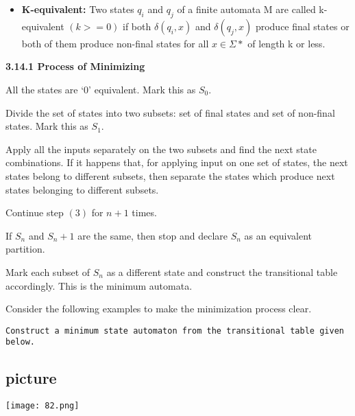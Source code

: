 \documentclass{article}
\begin{document}
\begin{itemize}
  \item \textbf{K-equivalent:} Two states $q_i$ and $q_j$ of a finite automata M are called k-equivalent $(k > = 0)$ if both
$\delta(q_i, x)$ and $\delta(q_j, x)$ produce final states or both of them produce non-final states for all $x \in \Sigma*$ of
length k or less.
\end{itemize}

\vspace*{0.3cm}

\LARGE{\textbf{3.14.1 Process of Minimizing}}

\vspace*{0.2cm}

\begin{itemize}
 \small{ \item All the states are ‘0’ equivalent. Mark this as $S_0$.
  \item Divide the set of states into two subsets: set of final states and set of non-final states. Mark this
as $S_1$.
  \item Apply all the inputs separately on the two subsets and find the next state combinations. If it happens
that, for applying input on one set of states, the next states belong to different subsets, then
separate the states which produce next states belonging to different subsets.
  \item Continue step $(3)$ for $n + 1$ times.
  \item If $S_n$ and $S_n + 1$ are the same, then stop and declare $S_n$ as an equivalent partition.
  \item Mark each subset of $S_n$ as a different state and construct the transitional table accordingly. This is
the minimum automata.}
\end{itemize}

Consider the following examples to make the minimization process clear.

\vspace*{0.3cm}
\hspace*{0.1cm} \texttt{Construct a minimum state automaton from the transitional table given below.}

\begin{center}
\section{picture}
\texttt{[image: 82.png]}
\end{center}
\end{document}
